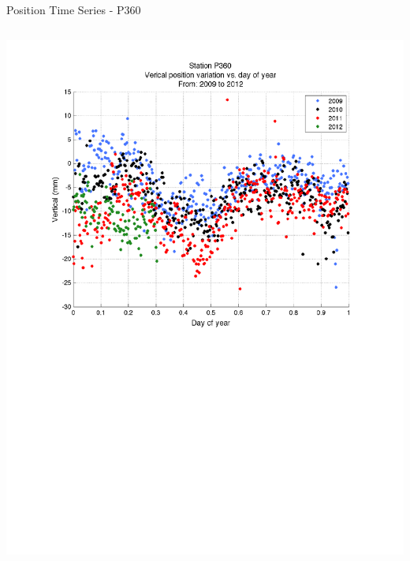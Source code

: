 \documentclass{beamer}
\begin{document}
\begin{frame}{Position Time Series - P360}
\begin{columns}
    \includegraphics[width=1\linewidth,trim=70 300 70 50, clip=true]{logan/p360_pos_byYear.pdf}
  \end{columns}
\end{frame}
\end{document}
